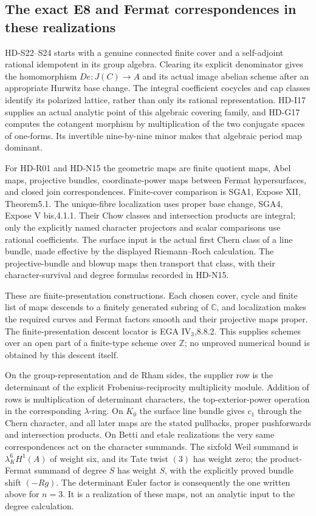 \subsection{The exact E8 and Fermat correspondences in these realizations}

HD-S22--S24 starts with a genuine connected finite cover and a
self-adjoint rational idempotent in its group algebra. Clearing its
explicit denominator gives the homomorphism $De:J(C)\to A$ and
its actual image abelian scheme after an appropriate Hurwitz base
change. The integral coefficient cocycles and cap classes identify
its polarized lattice, rather than only its rational representation.
HD-I17 supplies an actual analytic point of this algebraic covering
family, and HD-G17 computes the cotangent morphism by multiplication
of the two conjugate spaces of one-forms. Its invertible nine-by-nine
minor makes that algebraic period map dominant.

For HD-R01 and HD-N15 the geometric maps are finite quotient maps,
Abel maps, projective bundles, coordinate-power maps between Fermat
hypersurfaces, and closed join correspondences. Finite-cover comparison
is SGA1, Expose XII, Theorem5.1. The unique-fibre localization uses
proper base change, SGA4, Expose V bis,4.1.1. Their Chow classes and
intersection products are integral; only the explicitly named
character projectors and scalar comparisons use rational coefficients.
The surface input is the actual first Chern class of a line bundle,
made effective by the displayed Riemann--Roch calculation. The
projective-bundle and blowup maps then transport that class, with
their character-survival and degree formulas recorded in HD-N15.

These are finite-presentation constructions. Each chosen cover,
cycle and finite list of maps descends to a finitely generated
subring of $\mathbb C$, and localization makes the required curves
and Fermat factors smooth and their projective maps proper. The
finite-presentation descent locator is EGA IV$_3$,8.8.2. This supplies
schemes over an open part of a finite-type scheme over $\mathbb Z$;
no unproved numerical bound is obtained by this descent itself.

On the group-representation and de Rham sides, the supplier row is
the determinant of the explicit Frobenius-reciprocity multiplicity
module. Addition of rows is multiplication of determinant characters,
the top-exterior-power operation in the corresponding $\lambda$-ring.
On $K_0$ the surface line bundle gives $c_1$ through the Chern character,
and all later maps are the stated pullbacks, proper pushforwards and
intersection products. On Betti and etale realizations the very same
correspondences act on the character summands. The sixfold Weil
summand is $\lambda_K^6 H^1(A)$ of weight six, and its Tate twist
$(3)$ has weight zero; the product-Fermat summand of degree $S$ has
weight $S$, with the explicitly proved bundle shift $(-Rg)$.
The determinant Euler factor is consequently the one written above
for $n=3$. It is a realization of these maps, not an analytic input
to the degree calculation.

